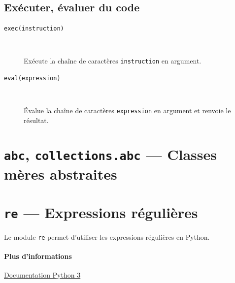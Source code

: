 \documentclass[a4paper, 10pt]{article}
\begin{document}
\subsection{Exécuter, évaluer du code}
\begin{description}
    \item[\texttt{exec(instruction)}]~
    
    Exécute la chaîne de caractères \texttt{instruction} en argument.

    \item[\texttt{eval(expression)}]~

    Évalue la chaîne de caractères \texttt{expression} en argument et renvoie le résultat.
\end{description}

\section{\texttt{abc}, \texttt{collections.abc} --- Classes mères abstraites}\label{abc}

\section{\texttt{re} --- Expressions régulières}
Le module \texttt{re}  permet d'utiliser les expressions régulières en Python.
\paragraph{Plus d'informations} \href{https://docs.python.org/fr/3/library/re.html}{Documentation Python 3}
\end{document}
